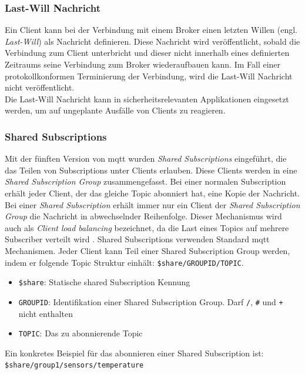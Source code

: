 \subsubsection{Last-Will Nachricht} \label{s:last-will}
Ein Client kann bei der Verbindung mit einem Broker einen letzten Willen (engl. \textit{Last-Will}) als Nachricht definieren. Diese Nachricht wird veröffentlicht, sobald die Verbindung zum Client unterbricht und dieser nicht innerhalb eines definierten Zeitraums seine Verbindung zum Broker wiederaufbauen kann.
Im Fall einer protokollkonformen Terminierung der Verbindung, wird die Last-Will Nachricht nicht veröffentlicht.
\cite{soniSURVEYMQTTPROTOCOL}\\
Die Last-Will Nachricht kann in sicherheitsrelevanten Applikationen eingesetzt werden, um auf ungeplante Ausfälle von Clients zu reagieren.

\subsubsection{Shared Subscriptions} \label{s:shared-subscriptions}
Mit der fünften Version von \ac{mqtt} wurden \textit{Shared Subscriptions} eingeführt, die das Teilen von Subscriptions unter Clients erlauben. Diese Clients werden in eine \textit{Shared Subscription Group} zusammengefasst. Bei einer normalen Subscription erhält jeder Client, der das gleiche Topic abonniert hat, eine Kopie der Nachricht. Bei einer \textit{Shared Subscription} erhält immer nur ein Client der \textit{Shared Subscription Group} die Nachricht in abwechselnder Reihenfolge. Dieser Mechanismus wird auch als \textit{Client load balancing} bezeichnet, da die Last eines Topics auf mehrere Subscriber verteilt wird \cite{raschbichlerMQTTHowNew}.
Shared Subscriptions verwenden Standard \ac{mqtt} Mechanismen. Jeder Client kann Teil einer Shared Subscription Group werden, indem er folgende Topic Struktur einhält: \verb|$share/GROUPID/TOPIC|.
\begin{itemize}
    \item \verb|$share|: Statische shared Subscription Kennung
    \item \verb|GROUPID|: Identifikation einer Shared Subscription Group. Darf \verb|/|, \verb|#| und \verb|+| nicht enthalten
    \item \verb|TOPIC|: Das zu abonnierende Topic
\end{itemize}
Ein konkretes Beispiel für das abonnieren einer Shared Subscription ist:
\newline
\verb|$share/group1/sensors/temperature|

